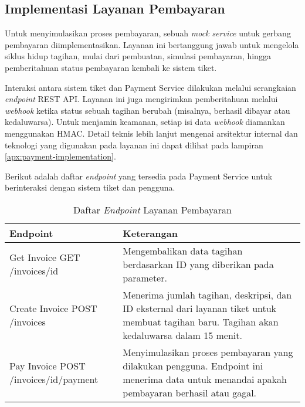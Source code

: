 \subsection{Implementasi Layanan Pembayaran}

Untuk menyimulasikan proses pembayaran, sebuah \textit{mock service} untuk gerbang pembayaran diimplementasikan. Layanan ini bertanggung jawab untuk mengelola siklus hidup tagihan, mulai dari pembuatan, simulasi pembayaran, hingga pemberitahuan status pembayaran kembali ke sistem tiket.

Interaksi antara sistem tiket dan Payment Service dilakukan melalui serangkaian \textit{endpoint} REST API. Layanan ini juga mengirimkan pemberitahuan melalui \textit{webhook} ketika status sebuah tagihan berubah (misalnya, berhasil dibayar atau kedaluwarsa). Untuk menjamin keamanan, setiap isi data \textit{webhook} diamankan menggunakan HMAC. Detail teknis lebih lanjut mengenai arsitektur internal dan teknologi yang digunakan pada layanan ini dapat dilihat pada lampiran \ref{apx:payment-implementation}.

Berikut adalah daftar \textit{endpoint} yang tersedia pada Payment Service untuk berinteraksi dengan sistem tiket dan pengguna.

\begin{table}[h!]
\centering
\caption{Daftar \textit{Endpoint} Layanan Pembayaran}
\begin{tabular}{|p{}|p{}|}
\hline
\textbf{Endpoint} & \textbf{Keterangan} \\
\hline
Get Invoice \newline GET /invoices/{id} & Mengembalikan data tagihan berdasarkan ID yang diberikan pada parameter. \\
\hline
Create Invoice \newline POST /invoices & Menerima jumlah tagihan, deskripsi, dan ID eksternal dari layanan tiket untuk membuat tagihan baru. Tagihan akan kedaluwarsa dalam 15 menit. \\
\hline
Pay Invoice \newline POST /invoices/{id}/payment & Menyimulasikan proses pembayaran yang dilakukan pengguna. Endpoint ini menerima data untuk menandai apakah pembayaran berhasil atau gagal. \\
\hline
\end{tabular}
\end{table}
